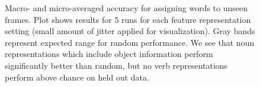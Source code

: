 \documentclass[11pt]{article}
\begin{document}
\begin{figure}[ht!]
\centering
{}%
%
%
\caption{Macro- and micro-averaged accuracy for assigning words to unseen frames. Plot shows results for 5 runs for each feature representation setting (small amount of jitter applied for visualization). Gray bands represent expected range for random performance. We see that noun representations which include object information perform significantly better than random, but no verb representations perform above chance on held out data.}
\label{fig:macro_micro}
\end{figure}
\end{document}

